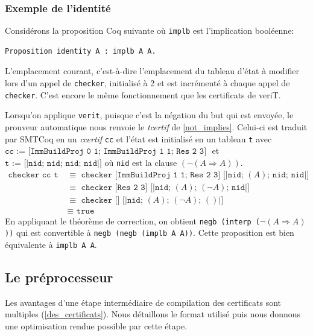 \documentclass[11pt]{article}
\begin{document}
\subsubsection{Exemple de l'identité}

Considérons la proposition Coq suivante où \texttt{implb} est l'implication booléenne:
\begin{lstlisting}[frame=single]
  Proposition identity A : implb A A.
\end{lstlisting}

L'emplacement courant, c'est-à-dire l'emplacement du tableau d'état à modifier lors d'un appel de \texttt{checker}, initialisé à 2 et est incrémenté à chaque appel de \texttt{checker}. C'est encore le même fonctionnement que les certificats de veriT. \medbreak

Lorsqu'on applique \texttt{verit}, puisque c'est la négation du but qui est envoyée, le prouveur automatique nous renvoie le \textit{tcertif} de \ref{not_implies}. Celui-ci est traduit par SMTCoq en un \textit{ccertif} \texttt{cc} et l'état est initialisé en un tableau \texttt{t} avec $\texttt{cc := [ImmBuildProj 0 1; ImmBuildProj 1 1; Res 2 3] }$ et $\texttt{t := [|nid; nid; nid; nid|]}$ où \texttt{nid} est la clause $(\neg (A \Rightarrow A))$.
\begin{align*}
  \texttt{checker cc t } &\equiv \,\, \texttt{checker [ImmBuildProj 1 1; Res 2 3] [|nid; }(A)\texttt{; nid; nid|]} \\
    &\equiv \,\, \texttt{checker [Res 2 3] [|nid; }(A)\texttt{; }(\neg A)\texttt{; nid|]} \\
    &\equiv \,\, \texttt{checker [] [|nid; }(A)\texttt{; }(\neg A)\texttt{; }()\texttt{|]} \\
    &\equiv \,\, \texttt{true}
\end{align*}
En appliquant le théorème de correction, on obtient \texttt{negb (interp (}$\neg (A \Rightarrow A)$\texttt{))} qui est convertible à \texttt{negb (negb (implb A A))}. Cette proposition est bien équivalente à \texttt{implb A A}.

\subsection{Le préprocesseur}

Les avantages d'une étape intermédiaire de compilation des certificats sont multiples (\ref{des_certificats}). Nous détaillons le format utilisé puis nous donnons une optimisation rendue possible par cette étape.
\end{document}
